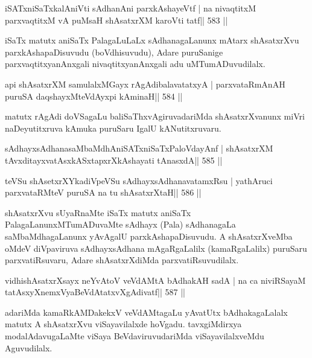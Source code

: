 \begin{shl}
iSATxniSaTxkalAniVti sAdhanAni parxkAshayeVtf |
na nivaqtitxM parxvaqtitxM vA puMsaH shAsatxrXM karoVti tatf\hfill || 583 ||
\end{shl}

\begin{artha}
iSaTx matutx aniSaTx PalagaLuLaLx sAdhanagaLanunx mAtarx shAsatxrXvu parxkAshapaDisuvudu (boVdhisuvudu), Adare puruSanige parxvaqtitxyanAnxgali nivaqtitxyanAnxgali adu uMTumADuvudilalx.
\end{artha}



\begin{shl}
api shAsatxrXM samulalxMGayx rAgAdibalavatatxyA |
parxvataRmAnAH puruSA daqshayxMteV\s dAyxpi kAminaH\hfill || 584 ||
\end{shl}

\begin{artha}
matutx rAgAdi doVSagaLu baliSaThxvAgiruvadariMda shAsatxrXvanunx miVri naDeyutitxruva kAmuka puruSaru IgalU kANutitxruvaru.
\end{artha}

\begin{shl}
sAdhayxsAdhanasaMbaMdhAniSATxniSaTxPaloVdayAnf |
shAsatxrXM tAvxditayxvatAsxkASxtapxrXkAshayati tAnasxdA\hfill || 585 ||
\end{shl}

\begin{shl}
teVSu shAsetxrXYkadiVpeVSu sAdhayxsAdhanavatamxRsu |
yathAruci parxvataRMteV puruSA na tu shAsatxrXtaH\hfill || 586 ||
\end{shl}

\begin{artha}
shAsatxrXvu sUyaRnaMte iSaTx matutx aniSaTx PalagaLanunxMTumADuvaMte sAdhayx (Pala) sAdhanagaLa saMbaMdhagaLanunx yAvAgalU parxkAshapaDisuvudu. A shAsatxrXveMba oMdeV diVpaviruva sAdhayxsAdhana mAgaRgaLalilx (kamaRgaLalilx) puruSaru parxvatiRsuvaru, Adare shAsatxrXdiMda parxvatiRsuvudilalx.
\end{artha}

\begin{shl}
vidhishAsatxrXsayx neYvAtoV veVdAMtA bAdhakAH sadA |
na ca niviRSayaM tatAsxyXnemxVyaBeVdAtatxvXgAdivatf\hfill || 587 ||
\end{shl}

\begin{artha}
adariMda kamaRkAMDakekxV veVdAMtagaLu yAvatUtx bAdhakagaLalalx matutx A shAsatxrXvu viSayavilalxde hoVgadu. tavxgiMdirxya modalAdavugaLaMte viSaya BeVdaviruvudariMda viSayavilalxveMdu Aguvudilalx.
\end{artha}

